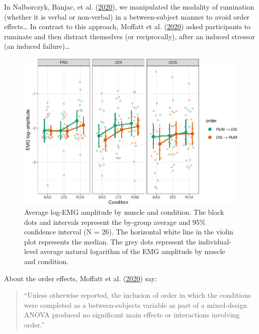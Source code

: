 \documentclass[
  english,
  man,floatsintext]{apa6}
\begin{document}
In Nalborczyk, Banjac, et al. (\protect\hyperlink{ref-nalborczyk_dissociating_2020}{2020}), we manipulated the modality of rumination (whether it is verbal or non-verbal) in a between-subject manner to avoid order effects\ldots{} In contrast to this approach, Moffatt et al. (\protect\hyperlink{ref-moffatt_inner_2020}{2020}) asked participants to ruminate and then distract themselves (or reciprocally), after an induced stressor (an induced failure)\ldots{}

\begin{figure}[!htb]

{\centering \includegraphics[width=1\linewidth]{reanalysis_files/figure-latex/order-1} 

}

\caption{Average log-EMG amplitude by muscle and condition. The black dots and intervals represent the by-group average and 95\% confidence interval (N = 26). The horizontal white line in the violin plot represents the median. The grey dots represent the individual-level average natural logarithm of the EMG amplitude by muscle and condition.}\label{fig:order}
\end{figure}

About the order effects, Moffatt et al. (\protect\hyperlink{ref-moffatt_inner_2020}{2020}) say:

\begin{quote}
``Unless otherwise reported, the inclusion of order in which the conditions were completed as a between-subjects variable as part of a mixed-design ANOVA produced no significant main effects or interactions involving order.''
\end{quote}
\end{document}
